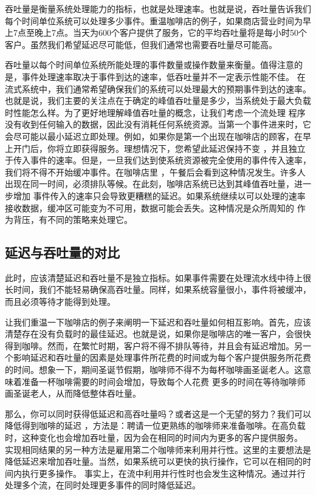 \documentclass[oneside]{ctexbook}
\begin{document}
吞吐量是衡量系统处理能力的指标，也就是处理速率。也就是说，吞吐量告诉我们每个时间单位系统可以处理多少事件。重温咖啡店的例子，如果商店营业时间为早上7点至晚上7点。当天为600个客户提供了服务，它的平均吞吐量将是每小时50个客户。虽然我们希望延迟尽可能低，但我们通常也需要吞吐量尽可能高。

吞吐量以每个时间单位系统所能处理的事件数量或操作数量来衡量。值得注意的是，事件处理速率取决于事件到达的速率，低吞吐量并不一定表示性能不佳。
在流式系统中，我们通常希望确保我们的系统可以处理最大的预期事件到达的速率。也就是说，我们主要的关注点在于确定的峰值吞吐量是多少，当系统处于最大负载时性能怎么样。为了更好地理解峰值吞吐量的概念，让我们考虑一个流处理
程序没有收到任何输入的数据，因此没有消耗任何系统资源。当第一个事件进来时，它会尽可能以最小延迟立即处理。例如，如果你是第一个出现在咖啡店的顾客，在早上开门后，你将立即获得服务。理想情况下，您希望此延迟保持不变
，并且独立于传入事件的速率。但是，一旦我们达到使系统资源被完全使用的事件传入速率，我们将不得不开始缓冲事件。在咖啡店里
，午餐后会看到这种情况发生。许多人出现在同一时间，必须排队等候。在此刻，咖啡店系统已达到其峰值吞吐量，进一步增加
事件传入的速率只会导致更糟糕的延迟。如果系统继续以可以处理的速率接收数据，缓冲区可能变为不可用，数据可能会丢失。这种情况是众所周知的
作为背压，有不同的策略来处理它。

\subsection{延迟与吞吐量的对比}

此时，应该清楚延迟和吞吐量不是独立指标。如果事件需要在处理流水线中待上很长时间，我们不能轻易确保高吞吐量。同样，如果系统容量很小，事件将被缓冲，而且必须等待才能得到处理。

让我们重温一下咖啡店的例子来阐明一下延迟和吞吐量如何相互影响。首先，应该清楚存在没有负载时的最佳延迟。也就是说，如果你是咖啡店的唯一客户，会很快得到咖啡。然而，在繁忙时期，客户将不得不排队等待，并且会有延迟增加。另一个影响延迟和吞吐量的因素是处理事件所花费的时间或为每个客户提供服务所花费的时间。想象一下，期间圣诞节假期，咖啡师不得不为每杯咖啡画圣诞老人。这意味着准备一杯咖啡需要的时间会增加，导致每个人花费
更多的时间在等待咖啡师画圣诞老人，从而降低整体吞吐量。

那么，你可以同时获得低延迟和高吞吐量吗？或者这是一个无望的努力？我们可以降低得到咖啡的延迟
，方法是：聘请一位更熟练的咖啡师来准备咖啡。在高负载时，这种变化也会增加吞吐量，因为会在相同的时间内为更多的客户提供服务。
实现相同结果的另一种方法是雇用第二个咖啡师来利用并行性。这里的主要想法是降低延迟来增加吞吐量。当然，如果系统可以更快的执行操作，它可以在相同的时间内执行更多操作。
事实上，在流中利用并行性时也会发生这种情况。通过并行处理多个流，在同时处理更多事件的同时降低延迟。
\end{document}
